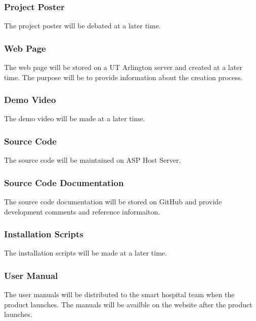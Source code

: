 \subsubsection{Project Poster}
The project poster will be debated at a later time.

\subsubsection{Web Page}
The web page will be stored on a UT Arlington server and created at a later time. The purpose will be to provide information about the creation process.

\subsubsection{Demo Video}
The demo video will be made at a later time.

\subsubsection{Source Code}
The source code will be maintained on ASP Host Server.

\subsubsection{Source Code Documentation}
The source code documentation will be stored on GitHub and provide development comments and reference informaiton.

\subsubsection{Installation Scripts}
The installation scripts will be made at a later time.

\subsubsection{User Manual}
The user manuals will be distributed to the smart hospital team when the product launches. The manuals will be availble on the website after the product launches.